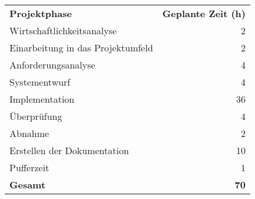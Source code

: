 \begin{tabular}{lr}
\rowcolor{KVGruen}\textbf{Projektphase} & \textbf{Geplante Zeit (h)} \\
Wirtschaftlichkeitsanalyse & 2 \\
\rowcolor{KVGrau}Einarbeitung in das Projektumfeld & 2 \\
Anforderungsanalyse & 4 \\
\rowcolor{KVGrau}Systementwurf & 4 \\
Implementation & 36 \\
\rowcolor{KVGrau}Überprüfung & 4 \\
Abnahme & 2 \\
\rowcolor{KVGrau}Erstellen der Dokumentation & 10 \\
Pufferzeit & 1 \\
\hline
\hline
\rowcolor{KVGrau}\textbf{Gesamt} & \textbf{70} \\
\end{tabular}
